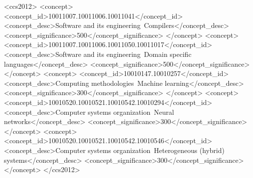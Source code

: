 \documentclass[sigplan,screen]{acmart}\settopmatter{}
\begin{document}
\begin{CCSXML}
<ccs2012>
<concept>
<concept_id>10011007.10011006.10011041</concept_id>
<concept_desc>Software and its engineering~Compilers</concept_desc>
<concept_significance>500</concept_significance>
</concept>
<concept>
<concept_id>10011007.10011006.10011050.10011017</concept_id>
<concept_desc>Software and its engineering~Domain specific languages</concept_desc>
<concept_significance>500</concept_significance>
</concept>
<concept>
<concept_id>10010147.10010257</concept_id>
<concept_desc>Computing methodologies~Machine learning</concept_desc>
<concept_significance>300</concept_significance>
</concept>
<concept>
<concept_id>10010520.10010521.10010542.10010294</concept_id>
<concept_desc>Computer systems organization~Neural networks</concept_desc>
<concept_significance>300</concept_significance>
</concept>
<concept>
<concept_id>10010520.10010521.10010542.10010546</concept_id>
<concept_desc>Computer systems organization~Heterogeneous (hybrid) systems</concept_desc>
<concept_significance>300</concept_significance>
</concept>
</ccs2012>
\end{CCSXML}





\maketitle
\end{document}
